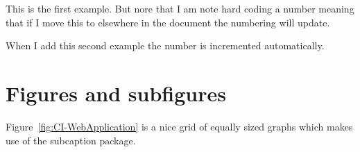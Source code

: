 \documentclass{article}
\begin{document}
\begin{example}	This is the first example. But nore that I am note hard coding a number meaning that if I move this to elsewhere in the document the numbering will update. \end{example}

\begin{example}	When I add this second example the number is incremented automatically. \end{example}


\section{Figures and subfigures}

Figure~\ref{fig:CI-WebApplication} is a nice grid of equally sized graphs which makes use of the subcaption package.
\end{document}
